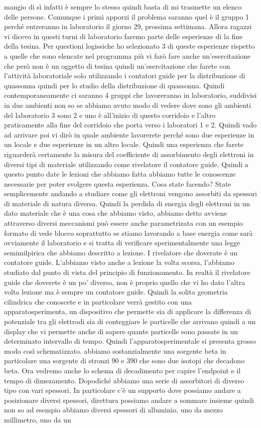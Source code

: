 mangio di sì infatti è sempre lo stesso quindi basta di mi trasmette un elenco delle persone. Comunque i primi apporzi il problema saranno quel è il gruppo 1 perché entreranno in laboratorio il giorno 29, prossima settimana. Allora ragazzi vi dicevo in questi turni di laboratorio faremo parte delle esperienze di la fine della tesina. Per questioni logissiche ho selezionato 3 di queste esperienze rispetto a quelle che sono elencate nel programma più vi farò fare anche un'esercitazione che però non è un oggetto di tesina quindi un'esercitazione che farete con l'attività laboratoriale solo utilizzando i contatori guide per la distribuzione di quassonna quindi per lo studio della distribuzione di quassonna. Quindi contemporaneamente ci saranno 4 gruppi che lavoreranno in laboratorio, suddivisi in due ambienti non so se abbiamo avuto modo di vedere dove sono gli ambienti del laboratorio 3 sono 2 e uno è all'inizio di questo corridoio e l'altro praticamente alla fine del corridoio che porta verso i laboratori 1 e 2. Quindi vado ad arrivare poi vi dirò in quale ambiente lavorerete perché sono due esperienze in un locale e due esperienze in un altro locale. Quindi una esperienza che farete riguarderà certamente la misura del coefficiente di assorbimento degli elettroni in diversi tipi di materiale utilizzando come rivelatore il contatore guide. Quindi a questo punto date le lezioni che abbiamo fatta abbiamo tutte le conoscenze necessarie per poter svolgere questa esperienza. Cosa state facendo? State semplicemente andando a studiare come gli elettroni vengono assorbiti da spessori di materiale di natura diversa. Quindi la perdida di energia degli elettroni in un dato materiale che è una cosa che abbiamo visto, abbiamo detto avviene attraverso diversi meccanismi può essere anche parametrizata con un esempio formato di vede blocco soprattutto se stiamo lavorando a base energia come sarà ovviamente il laboratorio e si tratta di verificare sperimentalmente una legge semimilpirica che abbiamo descritto a lezione. I rivelatore che doverate è un contatore guide. L'abbiamo visto anche a lezione la volta scorsa, l'abbiamo studiato dal punto di vista del principio di funzionamento. In realtà il rivelatore guide che doverete è un po' diverso, non è proprio quello che vi ho dato l'altra volta lezione ma è sempre un contatore guide. Quindi la solita geometria cilindrica che conoscete e in particolare verrà gestito con una apparatosperimenta, un dispositivo che permette sia di applicare la differenza di potenziale tra gli elettrodi sia di conteggiare le particelle che arrivano quindi a un display che vi permette anche di sapere quante particelle sono passate in un determinato intervallo di tempo. Quindi l'apparatosperimentale si presenta grosso modo così schematizzato. abbiamo sostanzialmente una sorgente beta in particolare una sorgente di stronzi 90 e 390 che sono due isotopi che decadono beta. Ora vedremo anche lo schema di decadimento per capire l'endpoint e il tempo di dimezamento. Dopodiché abbiamo una serie di assorbitori di diverso tipo con vari spessori. In particolare c'è un supporto dove possiamo andare a posizionare diversi spessori, direttura possiamo andare a sommare insieme quindi non so ad esempio abbiamo diversi spessori di alluminio, uno da mezzo millimetro, uno da un 